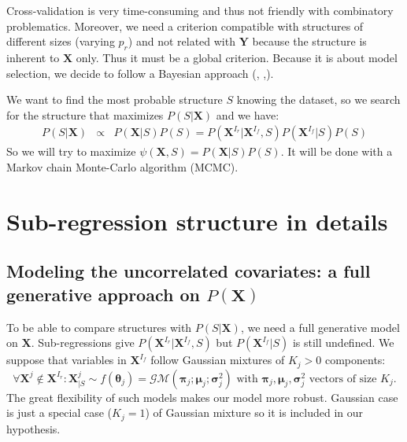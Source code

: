 \documentclass[12pt,a4paper]{report}
\begin{document}
Cross-validation is very time-consuming and thus not friendly with combinatory problematics. Moreover, we need a criterion compatible with structures of different sizes (varying $p_r$) and not related with $\boldsymbol{Y}$ because the structure is inherent to $\boldsymbol{X}$ only. Thus it must be a global criterion. 	
Because it is about model selection, we decide to follow a Bayesian approach (\cite{raftery1995bayesian}, \cite{andrieu1999joint},\cite{chipman2001practical}).  
	
We want to find the most probable structure $S$ knowing the dataset, so we search for the structure that maximizes $P(S|\boldsymbol{X})$ and we have:	
	\begin{eqnarray}
	 \label{approxBIC} P(S|\boldsymbol{X})&\propto & P(\boldsymbol{X}|S)P(S)
	=P(\boldsymbol{X}^{I_r}|\boldsymbol{X}^{I_f},S)P(\boldsymbol{X}^{I_f}|S)P(S)
	\end{eqnarray}
So we will try to maximize $\psi(\boldsymbol{X},S)=P(\boldsymbol{X}|S)P(S)$. It will be done with a Markov chain Monte-Carlo algorithm (MCMC).
	

\section{Sub-regression structure in details}
	\subsection{Modeling the uncorrelated covariates: a full generative approach on $P(\boldsymbol{X})$} \label{sectionfullgen}
	To be able to compare structures with $P(S|\boldsymbol{X})$, we need a full generative model on $\boldsymbol{X}$. Sub-regressions give $P(\boldsymbol{X}^{I_r}|\boldsymbol{X}^{I_f},S) $ but $P(\boldsymbol{X}^{I_f}|S)$ is still undefined. We suppose that variables in $\boldsymbol{X}^{I_f}$ follow Gaussian mixtures of $K_j >0$ components: 
	\begin{equation}
			\forall \boldsymbol{X}^j \notin \boldsymbol{X}^{I_r} : \boldsymbol{X}^j_{|S} \sim f(\boldsymbol{\theta}_j)=\mathcal{GM}(\boldsymbol{\pi}_j;\boldsymbol{\mu}_j;\boldsymbol{\sigma}^2_j) \textrm{ with } \boldsymbol{\pi}_j,\boldsymbol{\mu}_j,\boldsymbol{\sigma}^2_j \textrm{ vectors of size } K_j. \label{mixtureX1}
		\end{equation}
		The great flexibility \cite{mclachlan2004finite} of such models makes our model more robust. Gaussian case is just a special case ($K_j=1$) of Gaussian mixture so it is included in our hypothesis.
		
\end{document}
